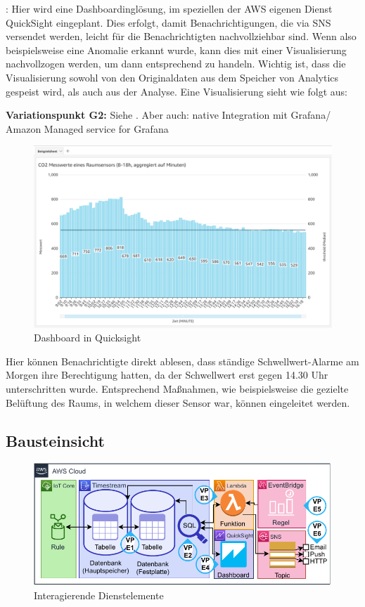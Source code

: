 : Hier wird eine Dashboardinglösung, im speziellen der \ac{AWS} eigenen Dienst QuickSight eingeplant. Dies erfolgt, damit Benachrichtigungen, die via \ac{SNS} versendet werden, leicht für die Benachrichtigten nachvollziehbar sind. Wenn also beispielsweise eine Anomalie erkannt wurde, kann dies mit einer Visualisierung nachvollzogen werden, um dann entsprechend zu handeln. Wichtig ist, dass die Visualisierung sowohl von den Originaldaten aus dem Speicher von \AWSIOT{} Analytics gespeist wird, als auch aus der Analyse. Eine Visualisierung sieht wie folgt aus:

\textbf{Variationspunkt G2:} Siehe . Aber auch: native Integration mit Grafana/ Amazon Managed service for Grafana

\begin{figure}[H]
\centering
\includegraphics[width=\textwidth]{graphics/QuickSight-Beispiel.png}
\caption{Dashboard in Quicksight}
\label{abb:DashboardDBRA}
\end{figure}

Hier können Benachrichtigte direkt ablesen, dass ständige Schwellwert-Alarme am Morgen ihre Berechtigung hatten, da der Schwellwert erst gegen 14.30 Uhr unterschritten wurde. Entsprechend Maßnahmen, wie beispielsweise die gezielte Belüftung des Raums, in welchem dieser Sensor war, können eingeleitet werden.

\subsection{Bausteinsicht}
\begin{figure}[H]
\centering
\includegraphics[width=\textwidth]{graphics/DB-RA-Elements.pdf}
\caption{Interagierende Dienstelemente}
\label{abb:ElementeDBRA}
\end{figure}

